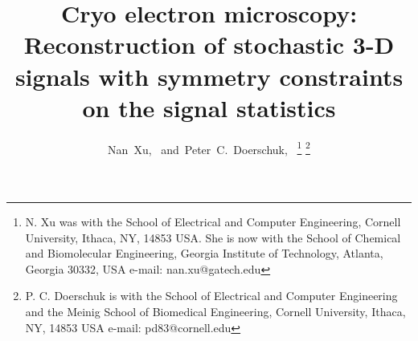 \title{Cryo electron microscopy: Reconstruction of stochastic 3-D signals with symmetry constraints on the signal statistics}
\author{Nan~Xu,~
        and~Peter~C.~Doerschuk,~%
\thanks{N. Xu was with the School
of Electrical and Computer Engineering, Cornell University, Ithaca, NY, 14853 USA.  She is now with the School of Chemical and Biomolecular Engineering, Georgia Institute of Technology, Atlanta, Georgia 30332, USA e-mail: nan.xu@gatech.edu
}%
\thanks{P. C. Doerschuk is with the School
	of Electrical and Computer Engineering and the Meinig School
	of Biomedical Engineering, Cornell University, Ithaca, NY, 14853 USA e-mail: pd83@cornell.edu}
}
%
%
\maketitle
